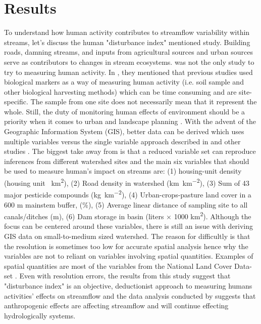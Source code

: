 \documentclass[a4paper,man,biblatex]{apa7}
\begin{document}
\section{Results}
\par To understand how human activity contributes to streamflow variability within streams, let's discuss the human "disturbance index" mentioned \textcite{falcone_2016} study. Building roads, damning streams, and inputs from agricultural sources and urban sources serve as contributors to changes in stream ecosystems. \textcite{falcone_2016} was not the only study to try to measuring human activity. In \textcite{stein_2002}, they mentioned that previous studies used biological markers as a way of measuring human activity (i.e. soil sample and other biological harvesting methods) which can be time consuming and are site-specific. The sample from one site does not necessarily mean that it represent the whole. Still, the duty of monitoring human effects of environment should be a priority when it comes to urban and landscape planning \autocite{stein_2002}. With the advent of the Geographic Information System (GIS), better data can be derived which uses multiple variables versus the single variable approach described in \textcite{stein_2002} and other studies \autocite{falcone_2016}. The biggest take away from \textcite{falcone_2016} is that a reduced variable set can reproduce inferences from different watershed sites and the main six variables that should be used to measure human's impact on streams are: (1) housing-unit density (housing unit \si{\per\square\kilo\meter}), (2) Road density in watershed (\si{\kilo\meter\per\square\kilo\meter}), (3) Sum of 43 major pesticide compounds (\si{\kilo\gram\per\square\kilo\meter}), (4) Urban-crops-pasture land cover in a 600 m mainstem buffer, (\%), (5) Average linear distance of sampling site to all canals/ditches (m), (6) Dam storage in basin (liters $\times$ 1000 \si{\square\kilo\meter}). Although the focus can be centered around these variables, there is still an issue with deriving GIS data on small-to-medium sized watershed. The reason for difficultly is that the resolution is sometimes too low for accurate spatial analysis hence why the variables are not to reliant on variables involving spatial quantities. Examples of spatial quantities are most of the variables from the National Land Cover Data-set \autocite{falcone_2016}. Even with resolution errors, the results from this study suggest that "disturbance index" is an objective, deductionist approach to measuring humans activities' effects on streamflow and the data analysis conducted by \textcite{mallakpour_2018} suggests that anthropogenic effects are affecting streamflow  and will continue effecting hydrologically systems.\\
\end{document}
